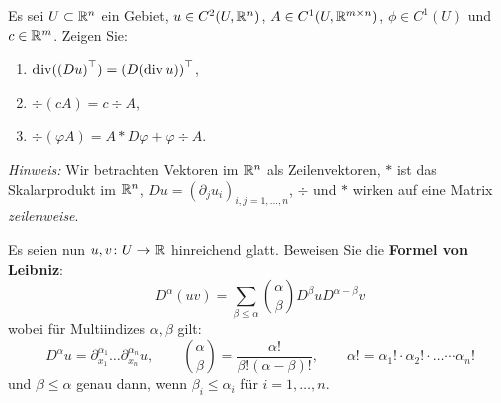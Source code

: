 \begin{exercisePage}
	
	\begin{task} Es sei $U \subset \mathbb{R}^n$ ein Gebiet, $u \in C^2(U,\mathbb{R}^n)$, $A \in C^1(U, \mathbb{R}^{m \times n})$, $\phi \in C^1(U)$ und $c \in \mathbb{R}^m$. Zeigen Sie:
		\begin{enumerate}
			\item $\operatorname{div} (\left( Du \right)^{\top}) = \left( D(\operatorname{div} u) \right)^{\top}$,
			\item $\div (cA) = c\div A$,
			\item $\div (\varphi A) = A * D\varphi + \varphi \div A$.
		\end{enumerate}
		\emph{Hinweis:} Wir betrachten Vektoren im $\mathbb{R}^n$ als Zeilenvektoren, $*$ ist das Skalarprodukt im $\mathbb{R}^n$, $Du = (\partial_j u_i)_{i,j=1,\dots,n}$, $\div$ und $*$ wirken auf eine Matrix \textit{zeilenweise}.
		
		Es seien nun $\abb{u,v}{U}{\R}$ hinreichend glatt. Beweisen Sie die \textbf{Formel von Leibniz}:
		\begin{equation*}
			D^\alpha(uv) = \sum_{\beta \leq \alpha} {\alpha \choose \beta} D^\beta u D^{\alpha-\beta}v
		\end{equation*}
		wobei für Multiindizes $\alpha, \beta$ gilt: 
		\begin{equation*}
			D^\alpha u = \partial_{x_1}^{\alpha_1}\dots\partial_{x_n}^{\alpha_n}u,\qquad {\alpha\choose\beta} = \frac{\alpha!}{\beta!(\alpha-\beta)!},\qquad \alpha! = \alpha_1!\cdot\alpha_2!\cdot\dots\cdots \alpha_n!
		\end{equation*}
		und $\beta \leq \alpha$ genau dann, wenn $\beta_i \leq \alpha_i$ für $i=1,\dots,n$.
	\end{task}


\end{exercisePage}
